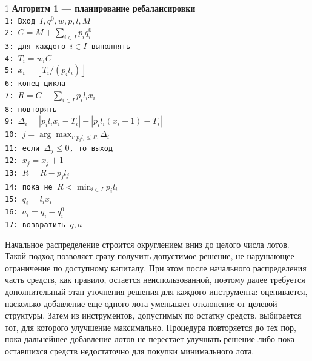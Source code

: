 \documentclass[14pt]{gost-7-32}
\begin{document}
\begin{center}
\begin{minipage}{0.92\textwidth}
\begin{spacing}{1}
\small
\setlength{\parindent}{0pt}
\setlength{\parskip}{0pt}
\textbf{Алгоритм 1 --- планирование ребалансировки}\\
\texttt{1: Вход \(I, q^0, w, p, l, M\)}\\
\texttt{2: \(C = M + \sum_{i \in I} p_i q_i^0\)}\\
\texttt{3: для каждого \(i \in I\) выполнять}\\
\texttt{4: \quad \(T_i = w_i C\)}\\
\texttt{5: \quad \(x_i = \left\lfloor T_i / (p_i l_i) \right\rfloor\)}\\
\texttt{6: конец цикла}\\
\texttt{7: \(R = C - \sum_{i \in I} p_i l_i x_i\)}\\
\texttt{8: повторять}\\
\texttt{9: \quad \(\Delta_i = |p_i l_i x_i - T_i| - |p_i l_i (x_i + 1) - T_i|\)}\\
\texttt{10: \quad \(j = \arg\max_{i: p_i l_i \le R} \Delta_i\)}\\
\texttt{11: \quad если \(\Delta_j \le 0\), то выход}\\
\texttt{12: \quad \(x_j = x_j + 1\)}\\
\texttt{13: \quad \(R = R - p_j l_j\)}\\
\texttt{14: пока не \(R < \min_{i \in I} p_i l_i\)}\\
\texttt{15: \(q_i = l_i x_i\)}\\
\texttt{16: \(a_i = q_i - q_i^0\)}\\
\texttt{17: возвратить \(q, a\)}
\end{spacing}
\end{minipage}
\end{center}

Начальное распределение строится округлением вниз до целого числа лотов. Такой подход позволяет сразу получить допустимое решение, не нарушающее ограничение по доступному капиталу. При этом после начального распределения часть средств, как правило, остается неиспользованной, поэтому далее требуется дополнительный этап уточнения решения для каждого инструмента: оценивается, насколько добавление еще одного лота уменьшает отклонение от целевой структуры. Затем из инструментов, допустимых по остатку средств, выбирается тот, для которого улучшение максимально. Процедура повторяется до тех пор, пока дальнейшее добавление лотов не перестает улучшать решение либо пока оставшихся средств недостаточно для покупки минимального лота.
\end{document}
